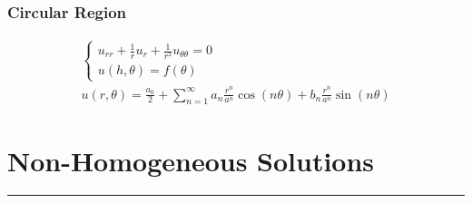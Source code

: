 \documentclass{article}
\begin{document}
\subsubsection*{Circular Region}
\begin{gather*}
\begin{cases}
u_{rr} + \frac{1}{r}u_{r} + \frac{1}{r^{2}}u_{\theta\theta} = 0\\
u(h,\theta)  = f(\theta)
\end{cases}\\
u(r,\theta) = \frac{a_{0}}{2} + \sum_{n=1}^{\infty}a_{n}\frac{r^{n}}{a^{n}}\cos{(n\theta)} + b_{n}\frac{r^{n}}{a^{n}}\sin{(n\theta)}
\end{gather*}
\newpage




\section{Non-Homogeneous Solutions}
\hrule
\noindent\\
\end{document}
